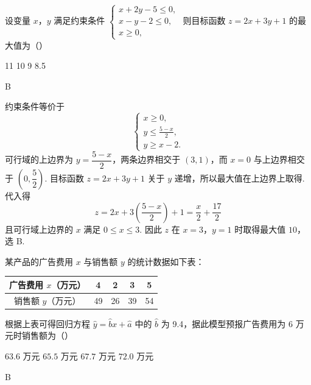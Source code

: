 \begin{problem}
设变量 \(x\)，\(y\) 满足约束条件 \(\begin{cases}
x + 2y - 5 \leqslant 0,\\
x - y - 2 \leqslant 0,\\
x \geqslant 0,
\end{cases}\) 则目标函数 \(z = 2x + 3y + 1\) 的最大值为（\quad）

\choices
    {11}
    {10}
    {9}
    {8.5}
\end{problem}

\begin{answer}
B
\end{answer}

\begin{solution}
约束条件等价于
\[
\begin{cases}
x\geqslant0,\\
y\leqslant\frac{5-x}{2},\\
y\geqslant x-2.
\end{cases}
\]
可行域的上边界为 \(y=\dfrac{5-x}{2}\)，两条边界相交于 \((3,1)\)，而 \(x=0\) 与上边界相交于 \(\left(0,\dfrac52\right)\). 目标函数 \(z=2x+3y+1\) 关于 \(y\) 递增，所以最大值在上边界上取得. 代入得
\[
z=2x+3\left(\frac{5-x}{2}\right)+1=\frac{x}{2}+\frac{17}{2}
\]
且可行域上边界的 \(x\) 满足 \(0\leqslant x\leqslant3\). 因此 \(z\) 在 \(x=3\)，\(y=1\) 时取得最大值 \(10\)，选 B.
\end{solution}

\begin{problem}
某产品的广告费用 \(x\) 与销售额 \(y\) 的统计数据如下表：

\begin{center}
\begin{tabular}{c|cccc}
广告费用 \(x\)（万元） & 4 & 2 & 3 & 5 \\
\hline
销售额 \(y\)（万元） & 49 & 26 & 39 & 54
\end{tabular}
\end{center}

根据上表可得回归方程 \(\hat{y} = \hat{b}x + \hat{a}\) 中的 \(\hat{b}\) 为 9.4，据此模型预报广告费用为 6 万元时销售额为（\quad）

\choices
    {\(63.6\text{ 万元}\)}
    {\(65.5\text{ 万元}\)}
    {\(67.7\text{ 万元}\)}
    {\(72.0\text{ 万元}\)}
\end{problem}

\begin{answer}
B
\end{answer}

